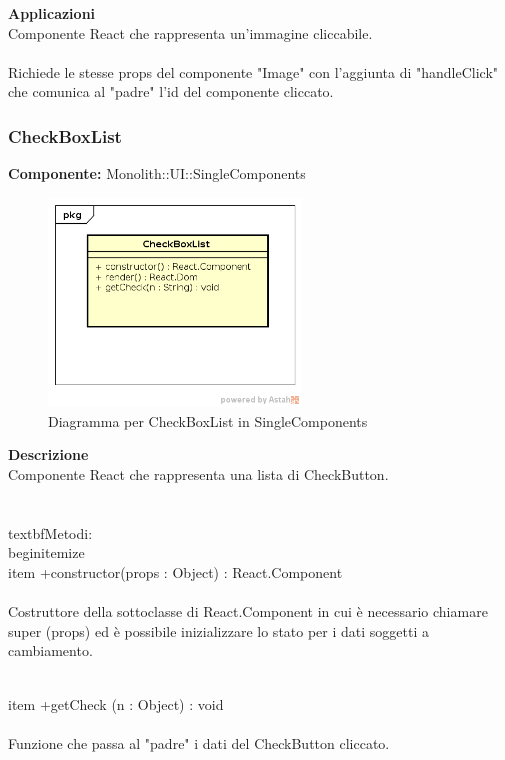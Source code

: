 \textbf{Applicazioni}\\
Componente React che rappresenta un'immagine cliccabile.\\\\ Richiede le stesse props del componente "Image" con l'aggiunta di "handleClick" che comunica al "padre" l'id del componente cliccato. 


\clearpage

\subsubsection{CheckBoxList}
\textbf{Componente:}  Monolith::UI::SingleComponents\\
   \FloatBarrier
   \begin{figure}[ht]
   \centering
   \includegraphics[width=0.6\textwidth]{img/single-CheckBoxList}
   \caption{{Diagramma per CheckBoxList in SingleComponents}}
\end{figure}
\FloatBarrier
\textbf{Descrizione}\\
Componente React che rappresenta una lista di CheckButton. \\\\
\\textbf{Metodi:} 
\\begin{itemize}
\\item +constructor(props : Object) : React.Component 
\\\\
Costruttore della sottoclasse di React.Component in cui è necessario chiamare super (props) ed è possibile inizializzare lo stato per i dati soggetti a cambiamento.

\\item +getCheck (n : Object) : void \\\\
Funzione che passa al "padre" i dati del CheckButton cliccato. 

